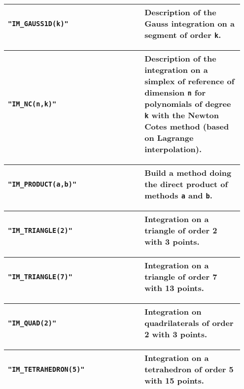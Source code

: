 \begin{center} \begin{tabular}{|m{0.55\linewidth}|m{0.4\linewidth}|} \hline
{\tt "IM\_GAUSS1D(k)" } & Description of the Gauss integration on a segment of order {\tt k}. \\ \hline
\end{tabular}  
\begin{tabular}{|m{0.55\linewidth}|m{0.4\linewidth}|} \hline
{\tt "IM\_NC(n,k)"} & Description of the integration on a simplex of reference of dimension {\tt n} for polynomials of degree {\tt k} with the Newton Cotes method (based on Lagrange interpolation).\\ \hline
\end{tabular}  
\begin{tabular}{|m{0.55\linewidth}|m{0.4\linewidth}|} \hline
{\tt "IM\_PRODUCT(a,b)"} & Build a method doing the direct product of methods {\tt a} and {\tt b}. \\ \hline
\end{tabular}  
\begin{tabular}{|m{0.55\linewidth}|m{0.4\linewidth}|} \hline
{\tt "IM\_TRIANGLE(2)"} & Integration on a triangle of order 2 with 3 points. \\ \hline
\end{tabular}
\begin{tabular}{|m{0.55\linewidth}|m{0.4\linewidth}|} \hline
{\tt "IM\_TRIANGLE(7)"} & Integration on a triangle of order 7 with 13 points. \\ \hline
\end{tabular} 
\begin{tabular}{|m{0.55\linewidth}|m{0.4\linewidth}|} \hline
{\tt "IM\_QUAD(2)"} & Integration on quadrilaterals of order 2 with 3 points. \\ \hline
\end{tabular}
\begin{tabular}{|m{0.55\linewidth}|m{0.4\linewidth}|} \hline
{\tt "IM\_TETRAHEDRON(5)"} & Integration on a tetrahedron of order 5 with 15 points. \\ \hline
\end{tabular} \end{center}
